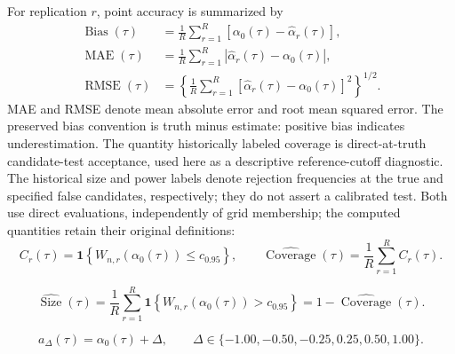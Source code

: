For replication $r$, point accuracy is summarized by
\begin{equation}
  \begin{aligned}
    \operatorname{Bias}(\tau)
      &=\frac{1}{R}\sum_{r=1}^{R}\left[\alpha_0(\tau)-\widehat{\alpha}_r(\tau)\right], \\
    \operatorname{MAE}(\tau)
      &=\frac{1}{R}\sum_{r=1}^{R}\left|\widehat{\alpha}_r(\tau)-\alpha_0(\tau)\right|, \\
    \operatorname{RMSE}(\tau)
      &=\left\{\frac{1}{R}\sum_{r=1}^{R}\left[\widehat{\alpha}_r(\tau)-\alpha_0(\tau)\right]^2\right\}^{1/2}.
  \end{aligned}
  \label{eq:performance-point}
\end{equation}
MAE and RMSE denote mean absolute error and root mean squared error. The preserved bias convention is truth minus estimate: positive bias indicates underestimation. The quantity historically labeled coverage is direct-at-truth candidate-test acceptance, used here as a descriptive reference-cutoff diagnostic. The historical size and power labels denote rejection frequencies at the true and specified false candidates, respectively; they do not assert a calibrated test. Both use direct evaluations, independently of grid membership; the computed quantities retain their original definitions:
\begin{equation}
  C_r(\tau)
    =\mathbf{1}\!\left\{W_{n,r}\!\left(\alpha_0(\tau)\right)\leq c_{0.95}\right\},
  \qquad
  \widehat{\operatorname{Coverage}}(\tau)
    =\frac{1}{R}\sum_{r=1}^{R}C_r(\tau).
  \label{eq:performance-coverage}
\end{equation}

\begin{equation}
  \widehat{\operatorname{Size}}(\tau)
    =\frac{1}{R}\sum_{r=1}^{R}
      \mathbf{1}\!\left\{W_{n,r}\!\left(\alpha_0(\tau)\right)>c_{0.95}\right\}
    =1-\widehat{\operatorname{Coverage}}(\tau).
  \label{eq:performance-size}
\end{equation}

\begin{equation}
  a_{\Delta}(\tau)=\alpha_0(\tau)+\Delta,
  \qquad
  \Delta\in\{-1.00,-0.50,-0.25,0.25,0.50,1.00\}.
  \label{eq:performance-alternatives}
\end{equation}

